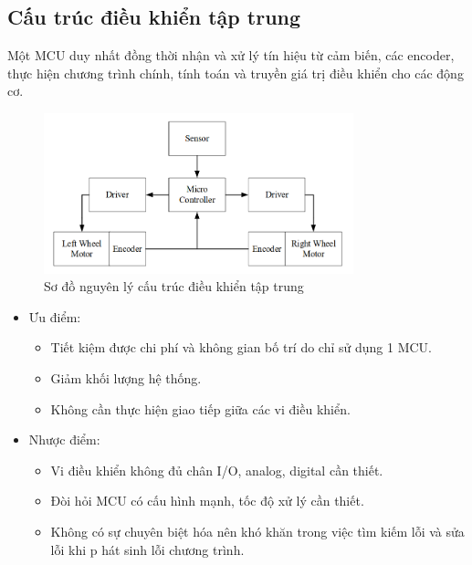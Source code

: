     \subsection{Cấu trúc điều khiển tập trung}
    \hspace*{0.6cm} Một MCU duy nhất đồng thời nhận và xử lý tín hiệu từ cảm biến, các encoder,
    thực hiện chương trình chính, tính toán và truyền giá trị điều khiển cho các động cơ.
    \begin{figure}[H]
        \centering
        \includegraphics[width=0.8\textwidth]{pictures/chapter1/chapter1_pic20_taptrung.png}
        \caption{Sơ đồ nguyên lý cấu trúc điều khiển tập trung}
        \label{chap1_pic20}
    \end{figure}
    \begin{itemize}
        \item Ưu điểm: 
        \begin{itemize}[label=\textendash]
            \item Tiết kiệm được chi phí và không gian bố trí do chỉ sử dụng 1 MCU.
            \item Giảm khối lượng hệ thống.
            \item Không cần thực hiện giao tiếp giữa các vi điều khiển.
        \end{itemize}
        \item Nhược điểm: 
        \begin{itemize}[label=\textendash]
            \item Vi điều khiển không đủ chân I/O, analog, digital cần thiết.
            \item Đòi hỏi MCU có cấu hình mạnh, tốc độ xử lý cần thiết.
            \item Không có sự chuyên biệt hóa nên khó khăn trong việc tìm kiếm lỗi và sửa lỗi khi
p           hát sinh lỗi chương trình.
        \end{itemize}
    \end{itemize}



